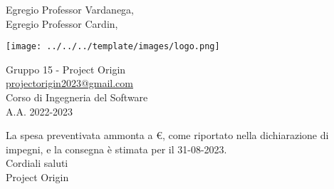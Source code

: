 \documentclass[12pt]{letter}
\begin{document}
    \begin{letter}{Egregio Professor Vardanega,\\Egregio Professor Cardin,}
        \begin{minipage}{.4\textwidth}
            \begin{flushleft}
            \end{flushleft}
        \end{minipage}
        \begin{minipage}{.5\textwidth}
            \begin{flushright}
                \texttt{[image: ../../../template/images/logo.png]}
            \end{flushright}
        \end{minipage}
        {    
        \begin{flushleft}
            Gruppo 15 - Project Origin\\ \href{mailto:projectorigin2023@gmail.com}{projectorigin2023@gmail.com}\\Corso di Ingegneria del Software\\A.A. 2022-2023
        \end{flushleft} 
        }
        La spesa preventivata ammonta a  \euro, come riportato nella dichiarazione di impegni, e la consegna è stimata per il 31-08-2023.\\
        {Cordiali saluti\\Project Origin}
    \end{letter}
\end{document}
